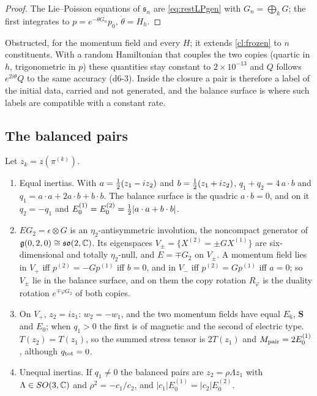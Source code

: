 \begin{proof}
The Lie--Poisson equations of $\mathfrak s_n$ are \eqref{eq:restLPgen} with $G_n=\bigoplus_kG$; the first integrates to $p=e^{-\theta G_n}p_0$,
$\dot\theta=H_h$.
\end{proof}

Obstructed, for the momentum field and every $H$; it extends \cref{cl:frozen} to $n$ constituents. With a random Hamiltonian that couples
the two copies (quartic in $h$, trigonometric in $p$) these quantities stay constant to $2\times10^{-13}$ and $Q$ follows $e^{2i\theta}Q$ to the
same accuracy (d6-3). Inside the closure a pair is therefore a label of the initial data, carried and not generated, and the balance surface is
where such labels are compatible with a constant rate.

\subsection{The balanced pairs}
\label{d6:sec:pairs}

\begin{proposition}
\label{d6:prop:pairs}
Let $z_k=z(\pi^{(k)})$.
\begin{enumerate}[label=(\roman*),leftmargin=2.2em]
\item Equal inertias. With $a=\tfrac12(z_1-iz_2)$ and $b=\tfrac12(z_1+iz_2)$, $q_1+q_2=4\,a\cdot b$ and $q_1=a\cdot a+2a\cdot b+b\cdot b$. The balance
surface is the quadric $a\cdot b=0$, and on it $q_2=-q_1$ and $E_0^{(1)}=E_0^{(2)}=\tfrac12|a\cdot a+b\cdot b|$.
\item $EG_2=\epsilon\otimes G$ is an $\eta_2$-antisymmetric involution, the noncompact generator of $\mathfrak g(0,2,0)\cong\mathfrak{so}(2,\mathbb{C})$. Its
eigenspaces $V_\pm=\{X^{(2)}=\pm GX^{(1)}\}$ are six-dimensional and totally $\eta_2$-null, and $E=\mp G_2$ on $V_\pm$. A momentum field lies in
$V_+$ iff $p^{(2)}=-Gp^{(1)}$ iff $b=0$, and in $V_-$ iff $p^{(2)}=Gp^{(1)}$ iff $a=0$; so $V_\pm$ lie in the balance surface, and on them the
copy rotation $R_\varphi$ is the duality rotation $e^{\mp\varphi G_2}$ of both copies.
\item On $V_+$, $z_2=iz_1$: $w_2=-w_1$, and the two momentum fields have equal $E_6$, $\mathbf S$ and $E_0$; when $q_1>0$ the first is of
magnetic and the second of electric type. $T(z_2)=T(z_1)$, so the summed stress tensor is $2T(z_1)$ and $M_{\rm pair}=2E_0^{(1)}$, although
$q_{\rm tot}=0$.
\item Unequal inertias. If $q_1\neq0$ the balanced pairs are $z_2=\rho\Lambda z_1$ with $\Lambda\in SO(3,\mathbb{C})$ and $\rho^2=-c_1/c_2$, and
$|c_1|E_0^{(1)}=|c_2|E_0^{(2)}$.
\end{enumerate}
\end{proposition}

